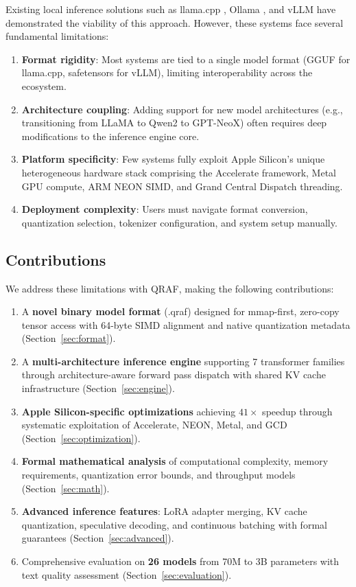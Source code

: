 \documentclass[12pt,a4paper]{article}
\begin{document}
Existing local inference solutions such as llama.cpp \citep{llamacpp2023}, Ollama \citep{ollama2024}, and vLLM \citep{kwon2023vllm} have demonstrated the viability of this approach. However, these systems face several fundamental limitations:

\begin{enumerate}[leftmargin=*]
    \item \textbf{Format rigidity}: Most systems are tied to a single model format (GGUF for llama.cpp, safetensors for vLLM), limiting interoperability across the ecosystem.
    \item \textbf{Architecture coupling}: Adding support for new model architectures (e.g., transitioning from LLaMA to Qwen2 to GPT-NeoX) often requires deep modifications to the inference engine core.
    \item \textbf{Platform specificity}: Few systems fully exploit Apple Silicon's unique heterogeneous hardware stack comprising the Accelerate framework, Metal GPU compute, ARM NEON SIMD, and Grand Central Dispatch threading.
    \item \textbf{Deployment complexity}: Users must navigate format conversion, quantization selection, tokenizer configuration, and system setup manually.
\end{enumerate}

\subsection{Contributions}

We address these limitations with QRAF, making the following contributions:

\begin{enumerate}[leftmargin=*]
    \item A \textbf{novel binary model format} (.qraf) designed for mmap-first, zero-copy tensor access with 64-byte SIMD alignment and native quantization metadata (Section~\ref{sec:format}).
    \item A \textbf{multi-architecture inference engine} supporting 7 transformer families through architecture-aware forward pass dispatch with shared KV cache infrastructure (Section~\ref{sec:engine}).
    \item \textbf{Apple Silicon-specific optimizations} achieving $41\times$ speedup through systematic exploitation of Accelerate, NEON, Metal, and GCD (Section~\ref{sec:optimization}).
    \item \textbf{Formal mathematical analysis} of computational complexity, memory requirements, quantization error bounds, and throughput models (Section~\ref{sec:math}).
    \item \textbf{Advanced inference features}: LoRA adapter merging, KV cache quantization, speculative decoding, and continuous batching with formal guarantees (Section~\ref{sec:advanced}).
    \item Comprehensive evaluation on \textbf{26 models} from 70M to 3B parameters with text quality assessment (Section~\ref{sec:evaluation}).
\end{enumerate}
\end{document}
